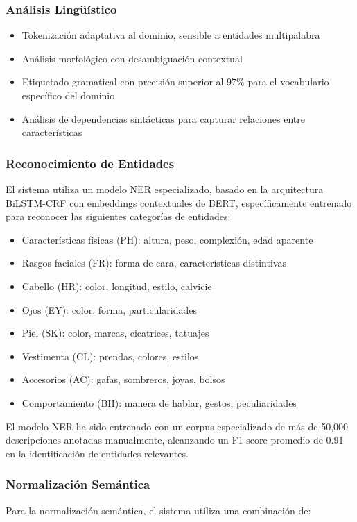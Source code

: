 \documentclass[12pt,a4paper]{article}
\begin{document}
\subsubsection{Análisis Lingüístico}
\begin{itemize}
    \item Tokenización adaptativa al dominio, sensible a entidades multipalabra
    \item Análisis morfológico con desambiguación contextual
    \item Etiquetado gramatical con precisión superior al 97\% para el vocabulario específico del dominio
    \item Análisis de dependencias sintácticas para capturar relaciones entre características
\end{itemize}

\subsubsection{Reconocimiento de Entidades}
El sistema utiliza un modelo NER especializado, basado en la arquitectura BiLSTM-CRF con embeddings contextuales de BERT, específicamente entrenado para reconocer las siguientes categorías de entidades:

\begin{itemize}
    \item Características físicas (PH): altura, peso, complexión, edad aparente
    \item Rasgos faciales (FR): forma de cara, características distintivas
    \item Cabello (HR): color, longitud, estilo, calvicie
    \item Ojos (EY): color, forma, particularidades
    \item Piel (SK): color, marcas, cicatrices, tatuajes
    \item Vestimenta (CL): prendas, colores, estilos
    \item Accesorios (AC): gafas, sombreros, joyas, bolsos
    \item Comportamiento (BH): manera de hablar, gestos, peculiaridades
\end{itemize}

El modelo NER ha sido entrenado con un corpus especializado de más de 50,000 descripciones anotadas manualmente, alcanzando un F1-score promedio de 0.91 en la identificación de entidades relevantes.

\subsubsection{Normalización Semántica}
Para la normalización semántica, el sistema utiliza una combinación de:
\end{document}
